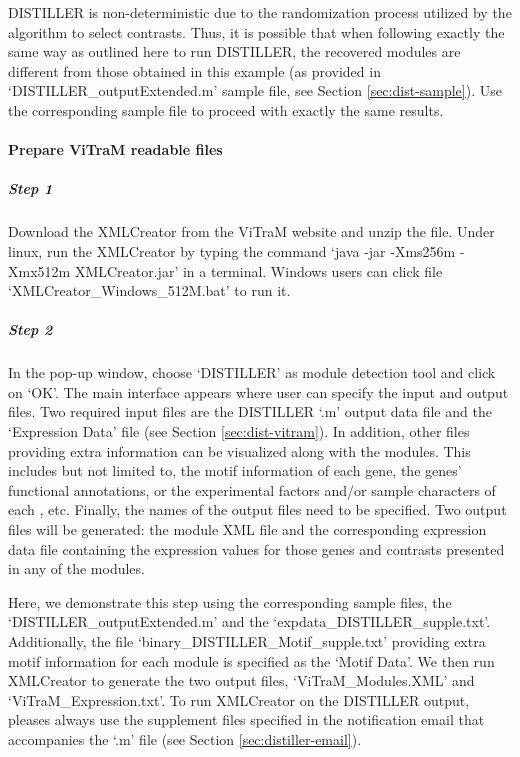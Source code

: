 DISTILLER is non-deterministic due to the randomization process utilized by the algorithm to select contrasts. Thus, it is possible that when following exactly the same way as outlined here to run DISTILLER, the recovered modules are different from those obtained in this example (as provided in `DISTILLER\_outputExtended.m' sample file, see Section \ref{sec:dist-sample}).  Use the corresponding sample file to proceed with exactly the same results.


\paragraph{Prepare ViTraM readable files}

\begin{small} %
\subparagraph{Step 1} Download the XMLCreator from the ViTraM website\cite{ViTraM} and unzip the file. Under linux, run the XMLCreator by typing the command `java -jar -Xms256m -Xmx512m XMLCreator.jar' in a terminal.  Windows users can click file `XMLCreator\_Windows\_512M.bat' to run it.

\subparagraph{Step 2} In the pop-up window, choose `DISTILLER' as module detection tool and click on `OK'.   The main interface appears where user can specify the input and output files. Two required input files are the DISTILLER `.m' output data file and the `Expression Data' file (see Section \ref{sec:dist-vitram}).  In addition, other files providing extra information can be visualized along with the modules. This includes but not limited to, the motif information of each gene, the genes' functional annotations, or the experimental factors and/or sample characters of each , etc. Finally, the names of the output files need to be specified. Two output files will be generated: the module XML file and the corresponding expression data file containing the expression values for those genes and contrasts presented in any of the modules. 

\end{small} %

Here, we demonstrate this step using the corresponding sample files, the `DISTILLER\_outputExtended.m' and the `expdata\_DISTILLER\_supple.txt'. Additionally, the file `binary\_DISTILLER\_Motif\_supple.txt' providing extra motif information for each module is specified as the `Motif Data'. We then run XMLCreator to generate the two output files, `ViTraM\_Modules.XML' and `ViTraM\_Expression.txt'. To run XMLCreator on the DISTILLER output, pleases always use the supplement files specified in the notification email that accompanies the `.m' file (see Section \ref{sec:distiller-email}).


